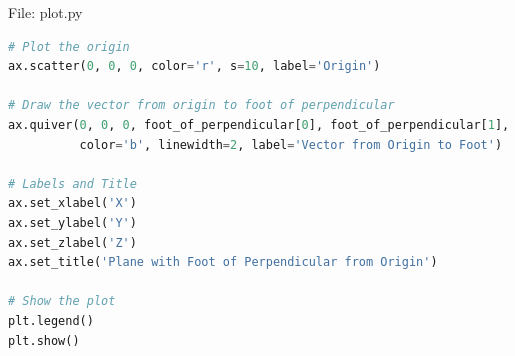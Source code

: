 \documentclass{beamer}
\numberwithin{equation}{section}
\theoremstyle{remark}
\begin{document}
\begin{frame}[fragile]{File: plot.py}
\begin{lstlisting}[language=Python]
# Plot the origin
ax.scatter(0, 0, 0, color='r', s=10, label='Origin')

# Draw the vector from origin to foot of perpendicular
ax.quiver(0, 0, 0, foot_of_perpendicular[0], foot_of_perpendicular[1], foot_of_perpendicular[2], 
          color='b', linewidth=2, label='Vector from Origin to Foot')

# Labels and Title
ax.set_xlabel('X')
ax.set_ylabel('Y')
ax.set_zlabel('Z')
ax.set_title('Plane with Foot of Perpendicular from Origin')

# Show the plot
plt.legend()
plt.show()

\end{lstlisting}
\end{frame}
\end{document}
